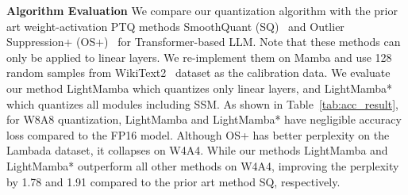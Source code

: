 \textbf{Algorithm Evaluation}
We compare our quantization algorithm 
with the prior art weight-activation PTQ methods
SmoothQuant (SQ)~\cite{xiao2023smoothquant}
and Outlier Suppression+ (OS+)~\cite{wei2023outlier} for Transformer-based LLM.
Note that these methods can only be applied to linear layers.
We re-implement them on Mamba
and use 128 random samples from WikiText2~\cite{merity2016pointer} dataset as the calibration data.
We evaluate our method LightMamba which quantizes only linear layers,
and LightMamba* which quantizes all modules including SSM.
As shown in Table~\ref{tab:acc_result}, for W8A8 quantization,
LightMamba and LightMamba* have negligible accuracy loss compared to the FP16 model.
Although OS+ has better perplexity on the Lambada dataset, it collapses on W4A4.
While our methods LightMamba and LightMamba* outperform all other methods on W4A4,
improving the perplexity by 1.78 and 1.91 compared to the prior art method SQ, respectively.

